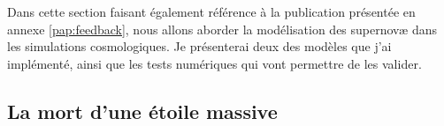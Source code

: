 
Dans cette section faisant également référence à la publication présentée en annexe \ref{pap:feedback}, nous allons aborder la modélisation des supernovæ dans les simulations cosmologiques.
Je présenterai deux des modèles que j'ai implémenté, ainsi que les tests numériques qui vont permettre de les valider.


%
%


\subsection{La mort d'une étoile massive}
\label{sec:snmort}

